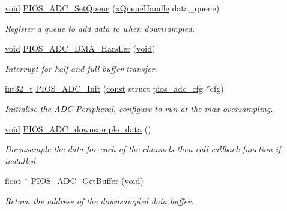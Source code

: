 \begin{DoxyCompactItemize}
\hyperlink{group___n_a_m_e_ga18028b8badbf1ea7e704ccac3c488e82}{void} \hyperlink{group___p_i_o_s___a_d_c_ga27cf963b58fa9ab8f73ea6aedec43f74}{P\-I\-O\-S\-\_\-\-A\-D\-C\-\_\-\-Set\-Queue} (\hyperlink{_common_2_libraries_2_free_r_t_o_s_2_source_2include_2queue_8h_a229037f755b756156e34a440ce134b8b}{x\-Queue\-Handle} data\-\_\-queue)
\begin{DoxyCompactList}\small\item\em Register a queue to add data to when downsampled. \end{DoxyCompactList}\item 
\hyperlink{group___n_a_m_e_ga18028b8badbf1ea7e704ccac3c488e82}{void} \hyperlink{group___p_i_o_s___a_d_c_gad37f0d162db269d768666bd699df5ee8}{P\-I\-O\-S\-\_\-\-A\-D\-C\-\_\-\-D\-M\-A\-\_\-\-Handler} (\hyperlink{group___n_a_m_e_ga18028b8badbf1ea7e704ccac3c488e82}{void})
\begin{DoxyCompactList}\small\item\em Interrupt for half and full buffer transfer. \end{DoxyCompactList}\item 
\hyperlink{group___n_a_m_e_gafd12020da5a235dfcf0c3c748fb5baed}{int32\-\_\-t} \hyperlink{group___p_i_o_s___a_d_c_ga7182b35f2962ad07826b045eb987a33a}{P\-I\-O\-S\-\_\-\-A\-D\-C\-\_\-\-Init} (\hyperlink{group___n_a_m_e_ga7ae6d0e43244213b34de2c2b9aa30da6}{const} struct \hyperlink{structpios__adc__cfg}{pios\-\_\-adc\-\_\-cfg} $\ast$cfg)
\begin{DoxyCompactList}\small\item\em Initialise the A\-D\-C Peripheral, configure to run at the max oversampling. \end{DoxyCompactList}\item 
\hyperlink{group___n_a_m_e_ga18028b8badbf1ea7e704ccac3c488e82}{void} \hyperlink{group___p_i_o_s___a_d_c_ga1a45c599137a6722f7a8d30470e21bb2}{P\-I\-O\-S\-\_\-\-A\-D\-C\-\_\-downsample\-\_\-data} ()
\begin{DoxyCompactList}\small\item\em Downsample the data for each of the channels then call callback function if installed. \end{DoxyCompactList}\item 
float $\ast$ \hyperlink{group___p_i_o_s___a_d_c_ga0d2a803571d249493aa10774c9358f0f}{P\-I\-O\-S\-\_\-\-A\-D\-C\-\_\-\-Get\-Buffer} (\hyperlink{group___n_a_m_e_ga18028b8badbf1ea7e704ccac3c488e82}{void})
\begin{DoxyCompactList}\small\item\em Return the address of the downsampled data buffer. \end{DoxyCompactList}\item 

\end{DoxyCompactItemize}
